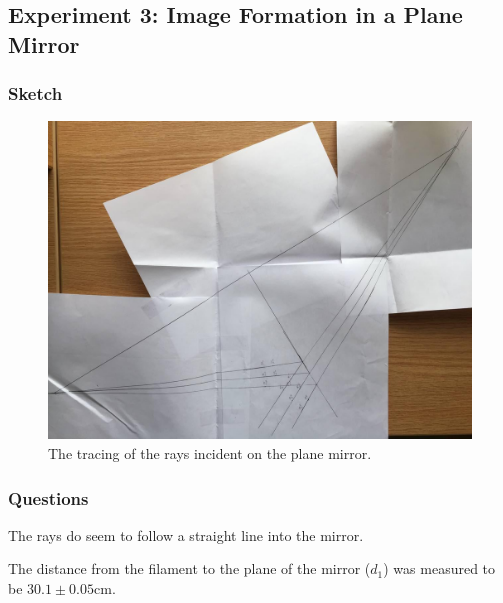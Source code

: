 \documentclass[12pt]{article}
\begin{document}


\subsection{Experiment 3: Image Formation in a Plane Mirror}

\subsubsection{Sketch}

\begin{figure}[H]
  \label{pic:exp3}
  \begin{center}
    \includegraphics[scale=0.3]{exp3.jpg}
  \end{center}
  \caption{The tracing of the rays incident on the plane mirror.}
\end{figure}

\subsubsection{Questions}

\subsubsubsection{}

The rays do seem to follow a straight line into the mirror.

\subsubsubsection{}

The distance from the filament to the plane of the mirror (\(d_1\)) was measured
to be \(30.1 \pm 0.05 \si{\centi\meter}\).

\subsubsubsection{}
\end{document}
